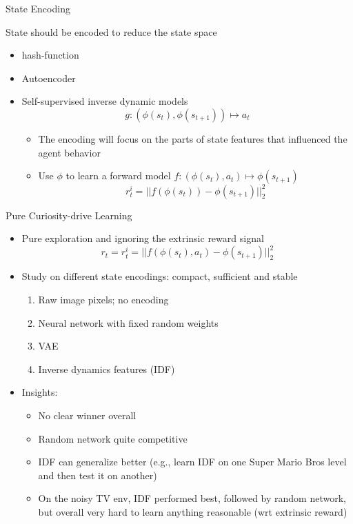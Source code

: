 \documentclass[aspectratio=169]{../latex_main/tntbeamer}  %
\begin{document}
\begin{frame}[c]{State Encoding}
	

	State should be encoded to reduce the state space
	\begin{itemize}
		\item hash-function~
		\item Autoencoder~
		\item Self-supervised inverse dynamic models~
		$$g: (\phi(s_t), \phi(s_{t+1})) \mapsto a_t $$
		\begin{itemize}
			\item The encoding will focus on the parts of state features that influenced the agent behavior
			\item Use $\phi$ to learn a forward model $f: (\phi(s_t), a_t) \mapsto \phi(s_{t+1})$
			$$ r_t^i = || f(\phi(s_{t})) - \phi(s_{t+1})||^2_2$$
		\end{itemize}
	\end{itemize}
	
	
\end{frame}
\begin{frame}[c]{Pure Curiosity-drive Learning~}
	
	\begin{itemize}
		\item Pure exploration and ignoring the extrinsic reward signal
		$$r_t  = r_t^i = ||f(\phi(s_t), a_t) - \phi(s_{t+1}) ||_2^2 $$
		\item Study on different state encodings: compact, sufficient and stable
		\begin{enumerate}
			\item Raw image pixels; no encoding
			\item Neural network with fixed random weights
			\item VAE
			\item Inverse dynamics features (IDF)
		\end{enumerate}
		\item Insights:
		\begin{itemize}
			\item No clear winner overall
			\item Random network quite competitive
			\item IDF can generalize better (e.g., learn IDF on one Super Mario Bros level and then test it on another)
			\item On the noisy TV env, IDF performed best, followed by random network, but overall very hard to learn anything reasonable (wrt extrinsic reward)
		\end{itemize}
	\end{itemize}
	
	
\end{frame}
\end{document}
